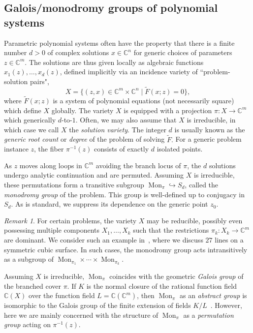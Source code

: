 \documentclass[11pt]{amsart}
\let\oldtextit\textit
\renewcommand\emph[1]{\oldtextit{\color{blue}#1}}
\theoremstyle{definition}
\theoremstyle{remark}
\newtheorem{remark}[definition]{Remark}
\newcommand{\CC}{{\mathbb C}}
\DeclareMathOperator{\Mon}{Mon}
\begin{document}
\subsection{Galois/monodromy groups of polynomial systems}\label{sec:galois-monodromy}


Parametric polynomial systems often have the property that there is a finite number $d>0$ of complex solutions $x\in\mathbb{C}^n$ for generic choices of parameters $z\in\mathbb{C}^m$. 
The solutions are thus given locally as algebraic functions $x_1(z), \dots , x_d (z)$, defined implicitly via an incidence variety of ``problem-solution pairs",
\begin{equation}\label{eq:solution-variety}
X = \{(z,x) \in \mathbb{C}^m \times \mathbb{C}^n \mid \tilde{F}(x;z) = 0\}, 
\end{equation}
where $\tilde{F}(x;z)$ is a system of polynomial equations (not necessarily square) which define $X$ globally.
The variety $X$ is equipped with a projection $\pi : X \to \mathbb{C}^m$ which generically $d$-to-$1$.
Often, we may also assume that $X$ is irreducible, in which case we call $X$ the \emph{solution variety}.
The integer $d$ is usually known as the \emph{generic root count} or \emph{degree} of the problem of solving $\tilde{F}.$
For a generic problem instance $z$, the fiber $\pi^{-1}(z)$ consists of exactly $d$ isolated points.


As $z$ moves along loops in $\mathbb{C}^m$ avoiding the branch locus of $\pi$, the $d$ solutions undergo analytic continuation and are permuted. Assuming $X$ is irreducible, these permutations form a transitive subgroup $\Mon_\pi\hookrightarrow S_d$, called the \emph{monodromy group} of the problem.
This group is well-defined up to conjugacy in $S_d$. As is standard, we suppress its dependence on the generic point $z_0$.

\begin{remark}\label{remark:reducible}
For certain problems, the variety $X$ may be reducible, possibly even possessing multiple components $X_1 ,\dots , X_k$ such that the restrictions $\pi_k : X_k \to \CC^m$ are dominant.
We consider such an example in~, where we discuss $27$ lines on a symmetric cubic surface.
In such cases, the monodromy group acts intransitively as a subgroup of $\Mon_{\pi_1}\times \cdots \times \Mon_{\pi_k}$.
\end{remark}

Assuming $X$ is irreducible, $\Mon_\pi$ coincides with the geometric \emph{Galois group} of the branched cover $\pi$. If $K$ is the normal closure of the rational function field $\mathbb{C}(X)$ over the function field $L=\mathbb{C}(\mathbb{C}^m)$, then $\Mon_\pi$ as an \textit{abstract group} is isomorphic to the Galois group of the finite extension of fields $K/L$~\cite[Section 1]{yahl}. However, here we are mainly concerned with the structure of $\Mon_\pi$ as a \textit{permutation group} acting on $\pi^{-1}(z).$
\end{document}
